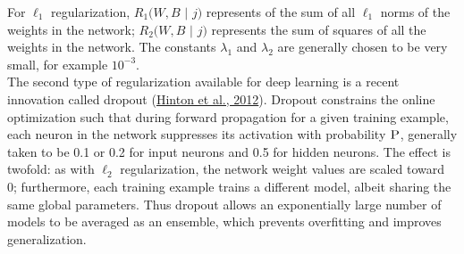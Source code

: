 \documentclass[12pt]{article}
\begin{document}
For $\ell_1$ regularization, $R_1(W,B$ $|$ $j)$ represents of the sum of all $\ell_1$ norms of the weights in the network; $R_2(W,B$ $|$ $j)$ represents the sum of squares of all the weights in the network. The constants $\lambda_1$ and $\lambda_2$ are generally chosen to be very small, for example $10^{-3}$. 
\\
The second type of regularization available for deep learning is a recent innovation called dropout (\href{http://arxiv.org/pdf/1207.0580.pdf}{Hinton et al., 2012}). Dropout constrains the online optimization such that during forward propagation for a given training example, each neuron in the network suppresses its activation with probability $\textsc{P}$, generally taken to be 0.1 or 0.2 for input neurons and 0.5 for hidden neurons. The effect is twofold: as with $\ell_2$ regularization, the network weight values are scaled toward 0; furthermore, each training example trains a different model, albeit sharing the same global parameters. Thus dropout allows an exponentially large number of models to be averaged as an ensemble, which prevents overfitting and improves generalization. 
\end{document}
